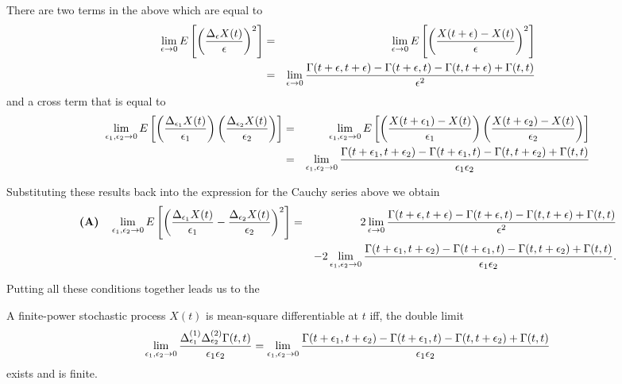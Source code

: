 There are two terms in the above which are equal to 
\begin{eqnarray*} 
\lim_{\epsilon \to 0}E\left[ \left({\Delta_{\epsilon} X(t)\over \epsilon}\right)^2\right] &=& \lim_{\epsilon \to 0}E\left[ \left({ X(t+\epsilon) - X(t) \over \epsilon}\right)^2\right]\\
&=& \lim_{\epsilon \to 0} {\Gamma(t+\epsilon, t+ \epsilon) - \Gamma(t+\epsilon, t) - \Gamma(t, t+\epsilon) + \Gamma(t,t) \over \epsilon^2}
\end{eqnarray*}
and a cross term that is equal to 
\begin{eqnarray*} 
\lim_{\epsilon_1, \epsilon_2 \to 0}E\left[ \left({\Delta_{\epsilon_1} X(t)\over \epsilon_1}\right) \left({\Delta_{\epsilon_2} X(t)\over \epsilon_2}\right)  \right] &=& 
\lim_{\epsilon_1, \epsilon_2 \to 0}E\left[ \left({ X(t+\epsilon_1) - X(t) \over \epsilon_1}\right) \left({ X(t+\epsilon_2) - X(t) \over \epsilon_2}\right)   \right]\\
&=& \lim_{\epsilon_1, \epsilon_2 \to 0} {\Gamma(t+\epsilon_1, t+ \epsilon_2) - \Gamma(t+\epsilon_1, t) - \Gamma(t, t+\epsilon_2) + \Gamma(t,t) \over \epsilon_1\epsilon_2}
\end{eqnarray*}

Substituting these results back into the expression for the Cauchy series above we obtain
\begin{eqnarray*} 
\hbox{\bf (A)}\quad \lim_{\epsilon_1, \epsilon_2\to 0}E\left[ \left({\Delta_{\epsilon_1} X(t)\over \epsilon_1}   - {\Delta_{\epsilon_2} X(t)\over \epsilon_2}   \right)^2\right] &=&
2 \lim_{\epsilon \to 0} {\Gamma(t+\epsilon, t+ \epsilon) - \Gamma(t+\epsilon, t) - \Gamma(t, t+\epsilon) + \Gamma(t,t) \over \epsilon^2} \\
&\null& -2\lim_{\epsilon_1, \epsilon_2 \to 0} {\Gamma(t+\epsilon_1, t+ \epsilon_2) - \Gamma(t+\epsilon_1, t) - \Gamma(t, t+\epsilon_2) + \Gamma(t,t) \over \epsilon_1\epsilon_2}.
\end{eqnarray*}

Putting all these conditions together leads us to the 
\begin{theorem}\label{thm:msDifferentiable}
A finite-power stochastic process $X(t)$ is mean-square differentiable at $t$ iff, the double limit
\[ \lim_{\epsilon_1, \epsilon_2\to 0} { \Delta^{(1)}_{\epsilon_1} \Delta^{(2)}_{\epsilon_2} \Gamma(t,t) \over \epsilon_1 \epsilon_2} =
\lim_{\epsilon_1, \epsilon_2 \to 0} {\Gamma(t+\epsilon_1, t+ \epsilon_2) - \Gamma(t+\epsilon_1, t) - \Gamma(t, t+\epsilon_2) + \Gamma(t,t) \over \epsilon_1\epsilon_2} \]
exists and is finite. 
\end{theorem}

